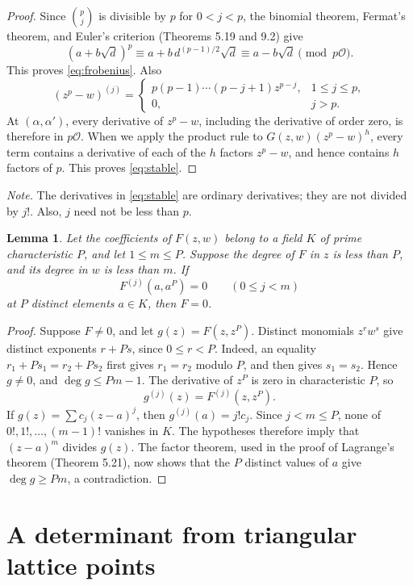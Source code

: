 \documentclass[11pt,twoside,leqno]{article}
\theoremstyle{apostol}
\newtheorem{lemma}[theorem]{Lemma}
\newcommand{\cO}{\mathcal O}
\begin{document}
\begin{proof}
Since \(\binom pj\) is divisible by \(p\) for \(0<j<p\), the binomial
theorem, Fermat's theorem, and Euler's criterion (Theorems 5.19 and 9.2) give
\[
 (a+b\sqrt d)^p\equiv a+b\,d^{(p-1)/2}\sqrt d
 \equiv a-b\sqrt d\pmod{p\cO}.
\]
This proves \eqref{eq:frobenius}. Also
\[
 (z^p-w)^{(j)}=
 \begin{cases}
 p(p-1)\cdots(p-j+1)z^{p-j},&1\le j\le p,\\
 0,&j>p.
 \end{cases}
\]
At \((\alpha,\alpha')\), every derivative of \(z^p-w\), including the
derivative of order zero, is therefore in \(p\cO\). When we apply the
product rule to \(G(z,w)(z^p-w)^h\), every term contains a derivative
of each of the \(h\) factors \(z^p-w\), and hence contains \(h\) factors
of \(p\). This proves \eqref{eq:stable}.
\end{proof}

\noindent\textit{Note.} The derivatives in \eqref{eq:stable} are ordinary
derivatives; they are not divided by \(j!\). Also, \(j\) need not be less
than \(p\).

\begin{lemma}\label{lem:roots}
Let the coefficients of \(F(z,w)\) belong to a field \(K\) of prime
characteristic \(P\), and let \(1\le m\le P\). Suppose the degree of
\(F\) in \(z\) is less than \(P\), and its degree in \(w\) is less than
\(m\). If
\[
 F^{(j)}(a,a^P)=0\qquad(0\le j<m)
\]
at \(P\) distinct elements \(a\in K\), then \(F=0\).
\end{lemma}

\begin{proof}
Suppose \(F\ne0\), and let \(g(z)=F(z,z^P)\). Distinct monomials
\(z^rw^s\) give distinct exponents \(r+Ps\), since \(0\le r<P\).
Indeed, an equality \(r_1+Ps_1=r_2+Ps_2\) first gives \(r_1=r_2\)
modulo \(P\), and then gives \(s_1=s_2\).
Hence \(g\ne0\), and \(\deg g\le Pm-1\).
The derivative of \(z^P\) is zero in characteristic \(P\), so
\[
 g^{(j)}(z)=F^{(j)}(z,z^P).
\]
If \(g(z)=\sum c_j(z-a)^j\), then \(g^{(j)}(a)=j!c_j\). Since
\(j<m\le P\), none of \(0!,1!,\ldots,(m-1)!\) vanishes in \(K\).
The hypotheses therefore imply that
\((z-a)^m\) divides \(g(z)\). The factor theorem, used in the proof of
Lagrange's theorem (Theorem 5.21), now shows that the \(P\) distinct
values of \(a\) give \(\deg g\ge Pm\), a contradiction.
\end{proof}

\section{A determinant from triangular lattice points}
\label{sec:determinant}
\end{document}
